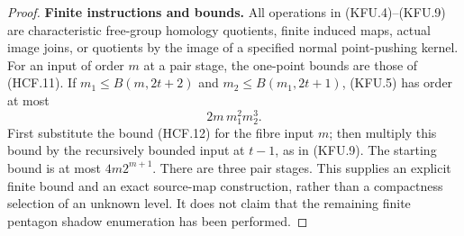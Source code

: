 \begin{proof}
\par\medskip\noindent\textbf{Finite instructions and bounds.}\quad
All operations in (KFU.4)--(KFU.9) are characteristic
free-group homology quotients, finite induced maps,
actual image joins, or quotients by the image of a
specified normal point-pushing kernel.
For an input of order $m$ at a pair stage, the one-point
bounds are those of (HCF.11).  If $m_1\leq B(m,2t+2)$
and $m_2\leq B(m_1,2t+1)$, (KFU.5) has order at most
\[
                         2m\,m_1^2m_2^3.              \tag{KFU.11}
\]
First substitute the bound (HCF.12) for the fibre input
$m$; then multiply this bound by the recursively bounded
input at $t-1$, as in (KFU.9).
The starting bound is at most $4m2^{m+1}$.
There are three pair stages.  This supplies an explicit
finite bound and an exact source-map construction, rather
than a compactness selection of an unknown level.
It does not claim that the remaining finite pentagon
shadow enumeration has been performed.
\end{proof}
